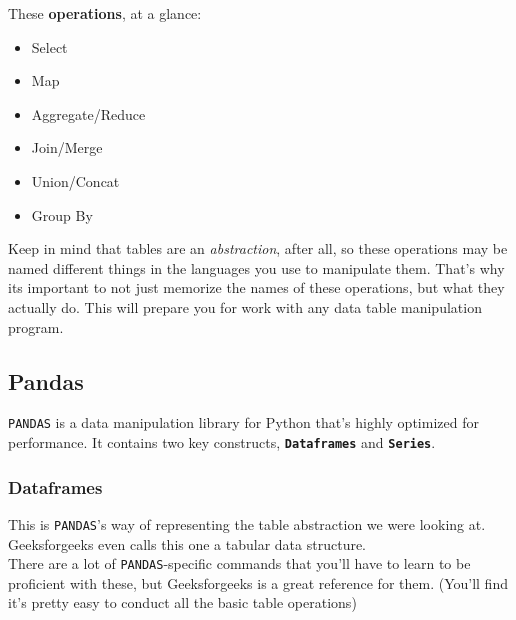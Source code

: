 \documentclass[english, 10pt]{article}
\begin{document}
These \textbf{operations}, at a glance:

\begin{itemize}
	\item Select
	\item Map
	\item Aggregate/Reduce
	\item Join/Merge
	\item Union/Concat
	\item Group By
\end{itemize} 

Keep in mind that tables are an \textit{abstraction}, after all, so these operations may be named different things in the languages you use to manipulate them. That's why its important to not just memorize the names of these operations, but what they actually do. This will prepare you for work with any data table manipulation program.

\subsection{Pandas}

\texttt{PANDAS} is a data manipulation library for Python that's highly optimized for performance. It contains two key constructs, \textbf{\texttt{Dataframes}} and \textbf{\texttt{Series}}.

\subsubsection{Dataframes}

This is \texttt{PANDAS}'s way of representing the table abstraction we were looking at. Geeksforgeeks even calls this one a tabular data structure.\\

There are a lot of \texttt{PANDAS}-specific commands that you'll have to learn to be proficient with these, but Geeksforgeeks is a great reference for them. (You'll find it's pretty easy to conduct all the basic table operations)\\
\end{document}
